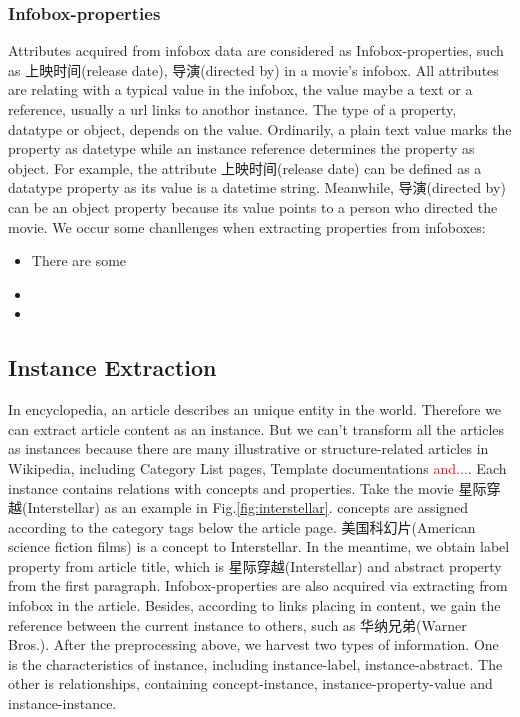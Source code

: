 \documentclass[runningheads,a4paper]{llncs}
\begin{document}
\subsubsection{Infobox-properties}
Attributes acquired from infobox data are considered as Infobox-properties, such as 上映时间(release date), 导演(directed by) in a movie's infobox. All attributes are relating with a typical value in the infobox, the value maybe a text or a reference, usually a url links to anothor instance. The type of a property, datatype or object, depends on the value. Ordinarily, a plain text value marks the property as datetype while an instance reference determines the property as object. For example, the attribute 上映时间(release date) can be defined as a datatype property as its value is a datetime string. Meanwhile, 导演(directed by) can be an object property because its value points to a person who directed the movie.
We occur some chanllenges when extracting properties from infoboxes:
\begin{itemize}
    \item There are some 
    \item 
    \item 
\end{itemize}

\subsection{Instance Extraction}
\label{sec:ie}
In encyclopedia, an article describes an unique entity in the world. Therefore we can extract article content as an instance. But we can't transform all the articles as instances because there are many illustrative or structure-related articles in Wikipedia, including Category List pages, Template documentations \textcolor{red}{and...}.
Each instance contains relations with concepts and properties. Take the movie 星际穿越(Interstellar) as an example in Fig.\ref{fig:interstellar}. concepts are assigned according to the category tags below the article page. 美国科幻片(American science fiction films) is a concept to Interstellar. In the meantime, we obtain label property from article title, which is 星际穿越(Interstellar) and abstract property from the first paragraph. Infobox-properties are also acquired via extracting from infobox in the article. Besides, according to links placing in content, we gain the reference between the current instance to others, such as 华纳兄弟(Warner Bros.).
After the preprocessing above, we harvest two types of information. One is the characteristics of instance, including instance-label, instance-abstract. The other is relationships, containing concept-instance, instance-property-value and instance-instance.
\end{document}
